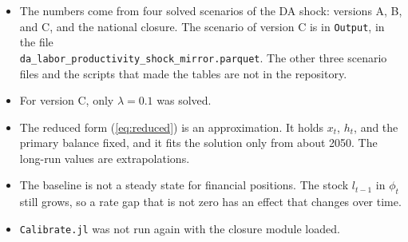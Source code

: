 \documentclass[11pt,a4paper]{article}
\newcommand{\code}[1]{\texttt{#1}}
\begin{document}
\begin{itemize}
\item The numbers come from four solved scenarios of the DA shock: versions A, B, and C, and the national closure. The scenario of version C is in \code{Output}, in the file\\ \code{da\_labor\_productivity\_shock\_mirror.parquet}. The other three scenario files and the scripts that made the tables are not in the repository.
\item For version C, only $\lambda = 0.1$ was solved.
\item The reduced form (\ref{eq:reduced}) is an approximation. It holds $x_t$, $h_t$, and the primary balance fixed, and it fits the solution only from about 2050. The long-run values are extrapolations.
\item The baseline is not a steady state for financial positions. The stock $l_{t-1}$ in $\phi_t$ still grows, so a rate gap that is not zero has an effect that changes over time.
\item \code{Calibrate.jl} was not run again with the closure module loaded.
\end{itemize}
\end{document}
